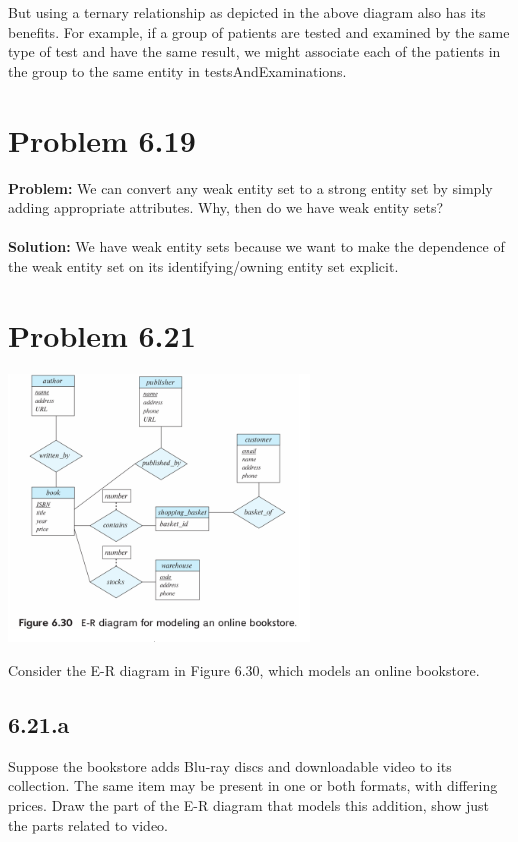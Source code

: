 \documentclass[12pt,a4paper]{article}
\begin{document}
But using a ternary relationship as depicted in the above diagram also has its benefits. For example, if a group of patients are tested and examined by the same type of test and have the same result, we might associate each of the patients in the group to the same entity in testsAndExaminations.

\section*{Problem 6.19}

\textbf{Problem:} We can convert any weak entity set to a strong entity set by simply adding appropriate attributes. Why, then do we have weak entity sets?\\
\\
\textbf{Solution:} We have weak entity sets because we want to make the dependence of the weak entity set on its identifying/owning entity set explicit.

\section*{Problem 6.21}
\begin{center}
\includegraphics[width=0.6\textwidth]{6.21Question.png}
\end{center}
 Consider the E-R diagram in Figure 6.30, which models an online bookstore.

\subsection*{6.21.a} Suppose the bookstore adds Blu-ray discs and downloadable video to its collection. The same item may be present in one or both formats, with differing prices. Draw the part of the E-R diagram that models this addition, show just the parts related to video.\\
\end{document}
